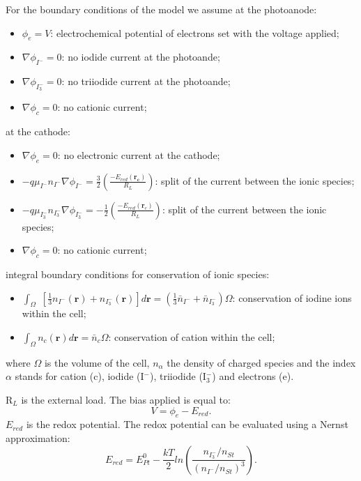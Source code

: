 For the boundary conditions of the model we assume at the
photoanode:
\begin{itemize}
    \item $\phi_{e} = V$: electrochemical potential of electrons set with the voltage applied;
    \item $\nabla\phi_{I^{-}} = 0$: no iodide current at the photoande;
    \item $\nabla\phi_{I_{3}^{-}} = 0$: no triiodide current at the photoande;
    \item $\nabla\phi_{c} = 0$: no cationic current;
\end{itemize}
at the cathode:
\begin{itemize}
    \item $\nabla\phi_{e} = 0$: no electronic current at the cathode;
    \item $-q\mu_{I^{-}}n_{I^{-}} \nabla\phi_{I^{-}} = \frac{3}{2}\left ( \frac{
    - E_{red}(\mathbf{r_{c}})}{R_{L}} \right )$: split of the current between the ionic species;
    \item $-q\mu_{I^{-}_{3}} n_{I^{-}_{3}}\nabla\phi_{I^{-}_{3}} =  -\frac{1}{2}\left ( \frac{
    - E_{red}(\mathbf{r}_{c})}{R_{L}} \right )$: split of the current between the ionic species;
    \item $\nabla\phi_{c} = 0$: no cationic current;
\end{itemize}
integral boundary conditions for conservation of ionic species:
\begin{itemize}
    \item $\int_{\Omega}$ $\left [ \frac{1}{3}n_{I^{-}}(\mathbf{r}) + n_{I^{-}_{3}}(\mathbf{r}) \right ] d\mathbf{r}
    = \left (\frac{1}{3}\bar{n}_{I^{-}} + \bar{n}_{I^{-}_{3}} \right )\Omega$: conservation of iodine ions within the cell;
    \item $\int_{\Omega} n_{c}(\mathbf{r}) d\mathbf{r}  =  \bar{n}_{c}\Omega$: conservation of cation within the cell;
\end{itemize}
where $\Omega$ is the volume of the cell, $n_{\alpha}$ the density
of charged species and the index $\alpha$ stands for cation (c),
iodide (I$^{-}$), triiodide (I$^{-}_{3}$) and electrons (e).


R$_{L}$ is the external load. The bias applied is equal to:
\begin{equation}\label{pot1}
    V = \phi_{e} - E_{red}.
\end{equation}
$E_{red}$ is the redox potential. The redox potential can be
evaluated using a Nernst approximation:
\begin{equation}\label{redox11}
    E_{red} = E^{0}_{Pt} - \frac{kT}{2} ln \left ( \frac{n_{I^{-}_{3}}/n_{St}}{ (n_{I^{-}}/n_{St})^{3} } \right
    ).
\end{equation}



